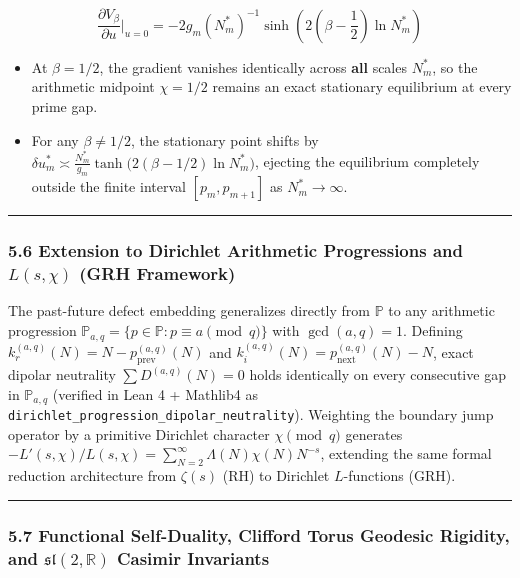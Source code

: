 \documentclass[
  11pt,
]{article}
\providecommand{\tightlist}{%
  \setlength{\itemsep}{0pt}\setlength{\parskip}{0pt}}
\begin{document}
\[\frac{\partial V_\beta}{\partial u}\bigg|_{u=0} = -2 g_m (N_m^*)^{-1} \sinh\left(2\left(\beta - \frac{1}{2}\right)\ln N_m^*\right)\]

\begin{itemize}
\tightlist
\item
  At \(\beta = 1/2\), the gradient vanishes identically across
  \textbf{all} scales \(N_m^*\), so the arithmetic midpoint
  \(\chi = 1/2\) remains an exact stationary equilibrium at every prime
  gap.
\item
  For any \(\beta \neq 1/2\), the stationary point shifts by
  \(\delta u_m^* \asymp \frac{N_m^*}{g_m}\tanh\big(2(\beta - 1/2)\ln N_m^*\big)\),
  ejecting the equilibrium completely outside the finite interval
  \([p_m, p_{m+1}]\) as \(N_m^* \to \infty\).
\end{itemize}

\begin{center}\rule{0.5\linewidth}{0.5pt}\end{center}

\subsubsection{\texorpdfstring{5.6 Extension to Dirichlet Arithmetic
Progressions and \(L(s, \chi)\) (GRH
Framework)}{5.6 Extension to Dirichlet Arithmetic Progressions and L(s, \textbackslash chi) (GRH Framework)}}\label{extension-to-dirichlet-arithmetic-progressions-and-ls-chi-grh-framework}

The past-future defect embedding generalizes directly from
\(\mathbb{P}\) to any arithmetic progression
\(\mathbb{P}_{a,q} = \{p \in \mathbb{P} : p \equiv a \pmod q\}\) with
\(\gcd(a, q) = 1\). Defining
\(k_r^{(a,q)}(N) = N - p_{\text{prev}}^{(a,q)}(N)\) and
\(k_i^{(a,q)}(N) = p_{\text{next}}^{(a,q)}(N) - N\), exact dipolar
neutrality \(\sum D^{(a,q)}(N) = 0\) holds identically on every
consecutive gap in \(\mathbb{P}_{a,q}\) (verified in Lean 4 + Mathlib4
as \texttt{dirichlet\_progression\_dipolar\_neutrality}). Weighting the
boundary jump operator by a primitive Dirichlet character
\(\chi \pmod q\) generates
\(-L'(s, \chi)/L(s, \chi) = \sum_{N=2}^\infty \Lambda(N)\chi(N) N^{-s}\),
extending the same formal reduction architecture from \(\zeta(s)\) (RH)
to Dirichlet \(L\)-functions (GRH).

\begin{center}\rule{0.5\linewidth}{0.5pt}\end{center}

\subsubsection{\texorpdfstring{5.7 Functional Self-Duality, Clifford
Torus Geodesic Rigidity, and \(\mathfrak{sl}(2, \mathbb{R})\) Casimir
Invariants}{5.7 Functional Self-Duality, Clifford Torus Geodesic Rigidity, and \textbackslash mathfrak\{sl\}(2, \textbackslash mathbb\{R\}) Casimir Invariants}}\label{functional-self-duality-clifford-torus-geodesic-rigidity-and-mathfraksl2-mathbbr-casimir-invariants}
\end{document}
